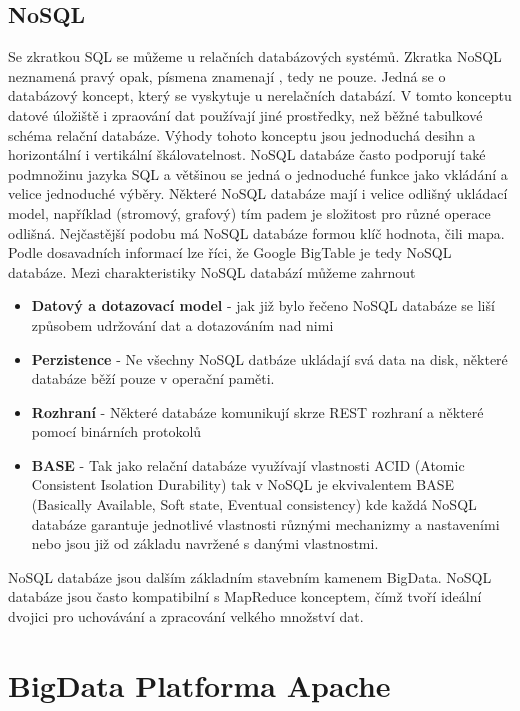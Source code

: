 \documentclass[thesis=M,czech]{FITthesis}[2012/06/26]
\begin{document}
\section{NoSQL}
Se zkratkou SQL se můžeme u relačních databázových systémů. Zkratka NoSQL neznamená pravý opak, písmena  znamenají , tedy ne pouze. Jedná se o databázový koncept, který se vyskytuje u nerelačních databází. V tomto konceptu datové úložiště i zpraování dat používají jiné prostředky, než běžné tabulkové schéma relační databáze. Výhody tohoto konceptu jsou jednoduchá desihn a horizontální i vertikální škálovatelnost. NoSQL databáze často podporují také podmnožinu jazyka SQL a většinou se jedná o jednoduché funkce jako vkládání a velice jednoduché výběry. Některé NoSQL databáze mají i velice odlišný ukládací model, například (stromový, grafový) tím padem je složitost  pro různé operace odlišná. Nejčastější podobu má NoSQL databáze formou klíč hodnota, čili mapa. Podle dosavadních informací lze říci, že Google BigTable je tedy NoSQL databáze. Mezi charakteristiky NoSQL databází můžeme zahrnout

\begin{itemize}
\item \textbf{Datový a dotazovací model} - jak již bylo řečeno NoSQL databáze se liší způsobem udržování dat a  dotazováním nad nimi
\item \textbf{Perzistence} - Ne všechny NoSQL datbáze ukládají svá data na disk, některé databáze běží pouze v operační paměti.
\item \textbf{Rozhraní} - Některé databáze komunikují skrze REST rozhraní a některé pomocí binárních protokolů 
\item \textbf{BASE} - Tak jako relační databáze využívají vlastnosti ACID (Atomic Consistent Isolation Durability) tak v NoSQL je ekvivalentem BASE (Basically Available, Soft state, Eventual consistency) kde každá NoSQL databáze garantuje jednotlivé vlastnosti různými mechanizmy a nastaveními nebo jsou již od základu navržené s danými vlastnostmi.   
\end{itemize}


NoSQL databáze jsou dalším základním stavebním kamenem BigData. NoSQL databáze jsou často kompatibilní s MapReduce konceptem, čímž tvoří ideální dvojici pro uchovávání a zpracování velkého množství dat. 



\chapter{BigData Platforma Apache}
\end{document}
